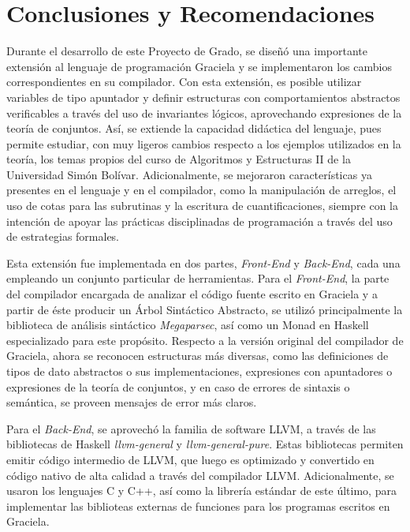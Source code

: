\chapter*{Conclusiones y Recomendaciones}
\label{conclusiones}

Durante el desarrollo de este Proyecto de Grado, se diseñó una importante
extensión al lenguaje de programación Graciela y se implementaron los cambios
correspondientes en su compilador. Con esta extensión, es posible utilizar
variables de tipo apuntador y definir estructuras con comportamientos abstractos
verificables a través del uso de invariantes lógicos, aprovechando expresiones
de la teoría de conjuntos. Así, se extiende la capacidad didáctica del lenguaje,
pues permite estudiar, con muy ligeros cambios respecto a los ejemplos
utilizados en la teoría, los temas propios del curso de Algoritmos y Estructuras
II de la Universidad Simón Bolívar. Adicionalmente, se mejoraron características
ya presentes en el lenguaje y en el compilador, como la manipulación de
arreglos, el uso de cotas para las subrutinas y la escritura de
cuantificaciones, siempre con la intención de apoyar las prácticas disciplinadas
de programación a través del uso de estrategias formales.

Esta extensión fue implementada en dos partes, \textit{Front-End} y
\textit{Back-End}, cada una empleando un conjunto particular de herramientas.
Para el \textit{Front-End}, la parte del compilador encargada de analizar el
código fuente escrito en Graciela y a partir de éste producir un Árbol
Sintáctico Abstracto, se utilizó principalmente la biblioteca de análisis
sintáctico \textit{Megaparsec}, así como un Monad en Haskell especializado para
este propósito. Respecto a la versión original del compilador de Graciela, ahora
se reconocen estructuras más diversas, como las definiciones de tipos de dato
abstractos o sus implementaciones, expresiones con apuntadores o expresiones de
la teoría de conjuntos, y en caso de errores de sintaxis o semántica, se proveen
mensajes de error más claros.

Para el \textit{Back-End}, se aprovechó la familia de software LLVM, a través de
las bibliotecas de Haskell \textit{llvm-general} y \textit{llvm-general-pure}.
Estas bibliotecas permiten emitir código intermedio de LLVM, que luego es
optimizado y convertido en código nativo de alta calidad a través del compilador
LLVM. Adicionalmente, se usaron los lenguajes C y C++, así como la librería
estándar de este último, para implementar las biblioteas externas de funciones
para los programas escritos en Graciela.

